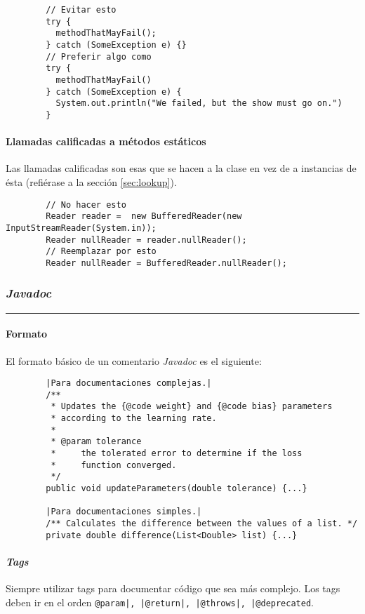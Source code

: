       \begin{verbatim}
        // Evitar esto
        try {
          methodThatMayFail();
        } catch (SomeException e) {}
        // Preferir algo como
        try {
          methodThatMayFail()
        } catch (SomeException e) {
          System.out.println("We failed, but the show must go on.")
        }
      \end{verbatim}
    \paragraph{Llamadas calificadas a métodos estáticos}
      Las llamadas calificadas son esas que se hacen a la clase en vez de a instancias de 
      ésta (refiérase a la sección \ref{sec:lookup}).

      \begin{verbatim}
        // No hacer esto
        Reader reader =  new BufferedReader(new InputStreamReader(System.in));
        Reader nullReader = reader.nullReader();
        // Reemplazar por esto
        Reader nullReader = BufferedReader.nullReader();         
      \end{verbatim}
  \subsubsection{\textit{Javadoc}}
    \vspace{-3ex}\rule{\linewidth}{1pt}

    \paragraph{Formato}
      El formato básico de un comentario \textit{Javadoc} es el siguiente:

      \begin{verbatim}
        |Para documentaciones complejas.|
        /**
         * Updates the {@code weight} and {@code bias} parameters
         * according to the learning rate.
         *
         * @param tolerance
         *     the tolerated error to determine if the loss
         *     function converged.
         */
        public void updateParameters(double tolerance) {...}

        |Para documentaciones simples.|
        /** Calculates the difference between the values of a list. */
        private double difference(List<Double> list) {...}
      \end{verbatim}
    \paragraph{\textit{Tags}}
      Siempre utilizar tags para documentar código que sea más complejo.
      Los tags deben ir en el orden 
      \texttt{@param|, |@return|, |@throws|, |@deprecated}.
